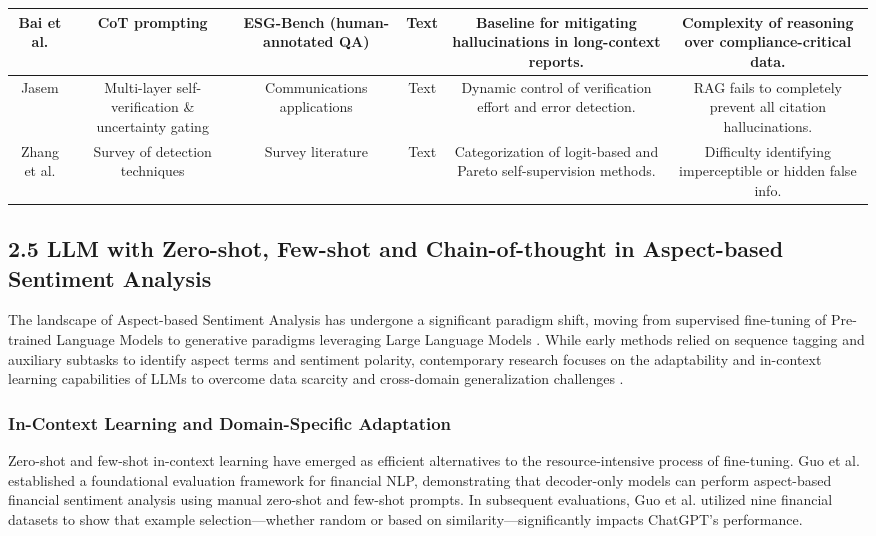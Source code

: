 \documentclass{article}
\begin{document}
\begin{table}[h!]
\begin{tabular}{|c|c|c|c|c|c|}
Bai et al.  \parencite{association_for_artificial_intelligence_2026_86e12eae} & CoT prompting & ESG-Bench (human-annotated QA) & Text & Baseline for mitigating hallucinations in long-context reports. & Complexity of reasoning over compliance-critical data. \\ \hline
Jasem  \parencite{al_noor_ali_aziz_jasem_af362154} & Multi-layer self-verification \& uncertainty gating & Communications applications & Text & Dynamic control of verification effort and error detection. & RAG fails to completely prevent all citation hallucinations. \\ \hline
Zhang et al.  \parencite{yue_zhang_9101e661} & Survey of detection techniques & Survey literature & Text & Categorization of logit-based and Pareto self-supervision methods. & Difficulty identifying imperceptible or hidden false info. \\ \hline
\end{tabular}
\end{table}
\subsection{2.5 LLM with Zero-shot, Few-shot and Chain-of-thought in Aspect-based Sentiment Analysis}

The landscape of Aspect-based Sentiment Analysis has undergone a significant paradigm shift, moving from supervised fine-tuning of Pre-trained Language Models to generative paradigms leveraging Large Language Models  \parencite[]{chengyan_wu_4c659eab, zhiyuan_ma_3b2e6db4}. While early methods relied on sequence tagging and auxiliary subtasks to identify aspect terms and sentiment polarity, contemporary research focuses on the adaptability and in-context learning capabilities of LLMs to overcome data scarcity and cross-domain generalization challenges  \parencite[]{nils_constantin_hellwig_6fa4e097, jakob_fehle_a0e62c9d}.
\subsubsection{In-Context Learning and Domain-Specific Adaptation}

Zero-shot and few-shot in-context learning have emerged as efficient alternatives to the resource-intensive process of fine-tuning. Guo et al.  \parencite{yue_guo_642efc19} established a foundational evaluation framework for financial NLP, demonstrating that decoder-only models can perform aspect-based financial sentiment analysis using manual zero-shot and few-shot prompts. In subsequent evaluations, Guo et al.  \parencite{yue_guo_642efc19} utilized nine financial datasets to show that example selection—whether random or based on similarity—significantly impacts ChatGPT's performance.
\end{document}

